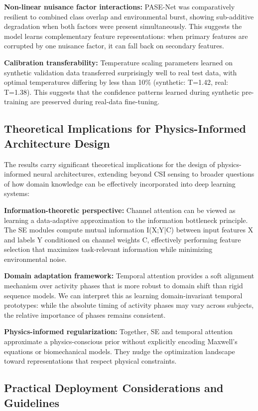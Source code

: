 \documentclass[lettersize,journal]{IEEEtran}
\begin{document}
\textbf{Non-linear nuisance factor interactions:} PASE-Net was comparatively resilient to combined class overlap and environmental burst, showing sub-additive degradation when both factors were present simultaneously. This suggests the model learns complementary feature representations: when primary features are corrupted by one nuisance factor, it can fall back on secondary features.

\textbf{Calibration transferability:} Temperature scaling parameters learned on synthetic validation data transferred surprisingly well to real test data, with optimal temperatures differing by less than 10\% (synthetic: T=1.42, real: T=1.38). This suggests that the confidence patterns learned during synthetic pre-training are preserved during real-data fine-tuning.

\subsection{Theoretical Implications for Physics-Informed Architecture Design}

The results carry significant theoretical implications for the design of physics-informed neural architectures, extending beyond CSI sensing to broader questions of how domain knowledge can be effectively incorporated into deep learning systems:

\textbf{Information-theoretic perspective:} Channel attention can be viewed as learning a data-adaptive approximation to the information bottleneck principle. The SE modules compute mutual information I(X;Y|C) between input features X and labels Y conditioned on channel weights C, effectively performing feature selection that maximizes task-relevant information while minimizing environmental noise.

\textbf{Domain adaptation framework:} Temporal attention provides a soft alignment mechanism over activity phases that is more robust to domain shift than rigid sequence models. We can interpret this as learning domain-invariant temporal prototypes: while the absolute timing of activity phases may vary across subjects, the relative importance of phases remains consistent.

\textbf{Physics-informed regularization:} Together, SE and temporal attention approximate a physics-conscious prior without explicitly encoding Maxwell's equations or biomechanical models. They nudge the optimization landscape toward representations that respect physical constraints.

\subsection{Practical Deployment Considerations and Guidelines}
\end{document}
